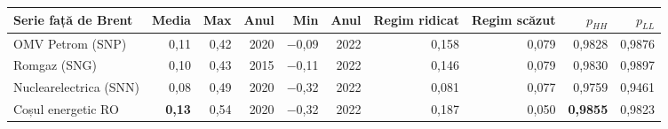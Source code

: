 \begin{tabular}{lrrrrrrrrr}
\toprule
Serie față de Brent & Media & Max & Anul & Min & Anul & Regim ridicat & Regim scăzut & $p_{HH}$ & $p_{LL}$ \\
\midrule
OMV Petrom (SNP) & 0,11 & 0,42 & 2020 & $-$0,09 & 2022 & 0,158 & 0,079 & 0,9828 & 0,9876 \\
Romgaz (SNG) & 0,10 & 0,43 & 2015 & $-$0,11 & 2022 & 0,146 & 0,079 & 0,9830 & 0,9897 \\
Nuclearelectrica (SNN) & 0,08 & 0,49 & 2020 & $-$0,32 & 2022 & 0,081 & 0,077 & 0,9759 & 0,9461 \\
Coșul energetic RO & \textbf{0,13} & 0,54 & 2020 & $-$0,32 & 2022 & 0,187 & 0,050 & \textbf{0,9855} & 0,9823 \\
\bottomrule
\end{tabular}
